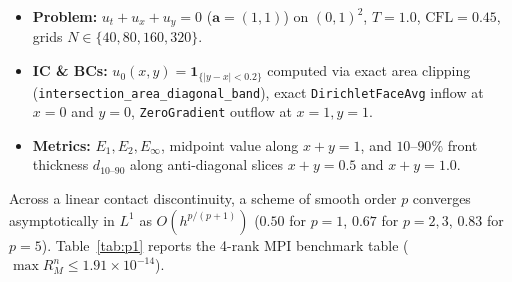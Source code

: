 \documentclass[11pt,a4paper]{article}
\theoremstyle{definition}
\newcommand{\code}[1]{\texttt{#1}}
\begin{document}
\begin{itemize}
\item \textbf{Problem:} $u_t + u_x + u_y = 0$ ($\mathbf{a}=(1,1)$) on $(0,1)^2$, $T=1.0$, $\mathrm{CFL}=0.45$, grids $N\in\{40,80,160,320\}$.
\item \textbf{IC \& BCs:} $u_0(x,y) = \mathbf{1}_{\{|y-x|<0.2\}}$ computed via exact area clipping (\code{intersection\_\allowbreak area\_\allowbreak diagonal\_\allowbreak band}), exact \code{DirichletFaceAvg} inflow at $x=0$ and $y=0$, \code{ZeroGradient} outflow at $x=1, y=1$.
\item \textbf{Metrics:} $E_1, E_2, E_\infty$, midpoint value along $x+y=1$, and $10\text{--}90\%$ front thickness $d_{10\text{--}90}$ along anti-diagonal slices $x+y=0.5$ and $x+y=1.0$.
\end{itemize}

Across a linear contact discontinuity, a scheme of smooth order $p$ converges asymptotically in $L^1$ as $O(h^{p/(p+1)})$ ($0.50$ for $p=1$, $0.67$ for $p=2,3$, $0.83$ for $p=5$). Table~\ref{tab:p1} reports the 4-rank MPI benchmark table ($\max R_M^n \le 1.91\times 10^{-14}$).
\end{document}
